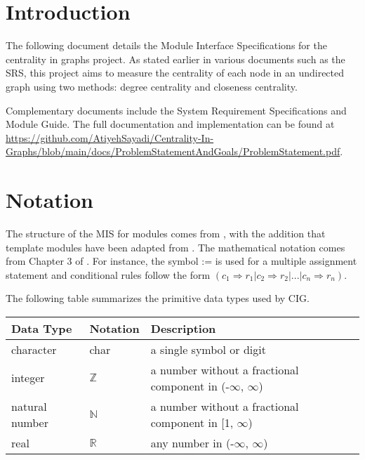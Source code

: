 \documentclass[12pt, titlepage]{article}
\begin{document}

\section{Introduction}

The following document details the Module Interface Specifications for the centrality in graphs project. As stated earlier in various documents such as the SRS, this project aims to measure the centrality of each node in an undirected graph using two methods: degree centrality and closeness centrality.

Complementary documents include the System Requirement Specifications
and Module Guide.  The full documentation and implementation can be
found at \url{https://github.com/AtiyehSayadi/Centrality-In-Graphs/blob/main/docs/ProblemStatementAndGoals/ProblemStatement.pdf}. 
\section{Notation}



The structure of the MIS for modules comes from \citet{HoffmanAndStrooper1995},
with the addition that template modules have been adapted from
\cite{GhezziEtAl2003}.  The mathematical notation comes from Chapter 3 of
\citet{HoffmanAndStrooper1995}.  For instance, the symbol := is used for a
multiple assignment statement and conditional rules follow the form $(c_1
\Rightarrow r_1 | c_2 \Rightarrow r_2 | ... | c_n \Rightarrow r_n )$.

The following table summarizes the primitive data types used by CIG. 

\begin{center}
\renewcommand{\arraystretch}{1.2}
\noindent 
\begin{tabular}{l l p{7.5cm}} 
\toprule 
\textbf{Data Type} & \textbf{Notation} & \textbf{Description}\\ 
\midrule
character & char & a single symbol or digit\\
integer & $\mathbb{Z}$ & a number without a fractional component in (-$\infty$, $\infty$) \\
natural number & $\mathbb{N}$ & a number without a fractional component in [1, $\infty$) \\
real & $\mathbb{R}$ & any number in (-$\infty$, $\infty$)\\
\bottomrule
\end{tabular} 
\end{center}
\end{document}
